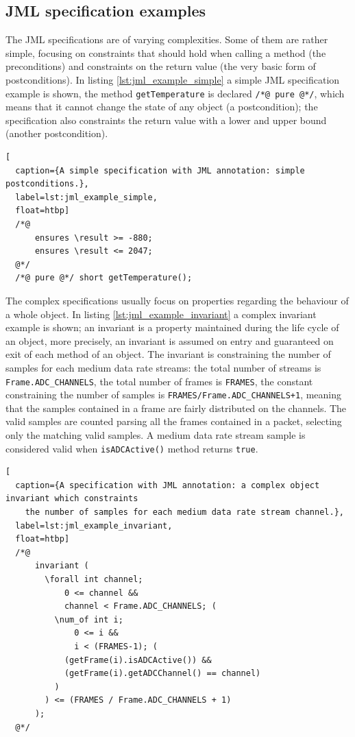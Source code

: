 \documentclass[english]{lni}
\newcommand{\lil}[1]{\texttt{\lstinline|#1|}}
\begin{document}
\subsection{JML specification examples}
\label{subsec:a_jml_specification_example}

The JML specifications are of varying complexities.  
Some of them are rather simple, focusing on constraints that should hold when calling a method (the preconditions) and constraints on the return value (the very basic form of postconditions). 
In listing \ref{lst:jml_example_simple} a simple JML specification example is shown, the method \lil{getTemperature} is declared \lil{/*@ pure @*/}, which means that it cannot change the state of any object (a postcondition); the specification also constraints the return value with a lower and upper bound (another postcondition).

\begin{lstlisting}[
  caption={A simple specification with JML annotation: simple postconditions.},
  label=lst:jml_example_simple,
  float=htbp]
  /*@ 
      ensures \result >= -880; 
      ensures \result <= 2047; 
  @*/ 
  /*@ pure @*/ short getTemperature();
\end{lstlisting}

\sloppy

The complex specifications usually focus on properties regarding the behaviour of a whole object.
In listing \ref{lst:jml_example_invariant} a complex invariant example is shown; an invariant is a property maintained during the life cycle of an object, more precisely, an invariant is assumed on entry and guaranteed on exit of each method of an object. 
The invariant is constraining the number of samples for each medium data rate streams: the total number of streams is \lil{Frame.ADC_CHANNELS}, the total number of frames is \lil{FRAMES}, the constant constraining the number of samples is \lil{FRAMES/Frame.ADC_CHANNELS+1}, meaning that the samples contained in a frame are fairly distributed on the channels.
The valid samples are counted parsing all the frames contained in a packet, selecting only the matching valid samples.  
A medium data rate stream sample is considered valid when \lil{isADCActive()} method returns \lil{true}.

\fussy

\begin{lstlisting}[
  caption={A specification with JML annotation: a complex object invariant which constraints 
    the number of samples for each medium data rate stream channel.},
  label=lst:jml_example_invariant,
  float=htbp]
  /*@ 
      invariant ( 
        \forall int channel; 
            0 <= channel && 
            channel < Frame.ADC_CHANNELS; ( 
          \num_of int i; 
              0 <= i && 
              i < (FRAMES-1); (
            (getFrame(i).isADCActive()) && 
            (getFrame(i).getADCChannel() == channel)
          ) 
        ) <= (FRAMES / Frame.ADC_CHANNELS + 1) 
      ); 
  @*/
\end{lstlisting}
\end{document}

